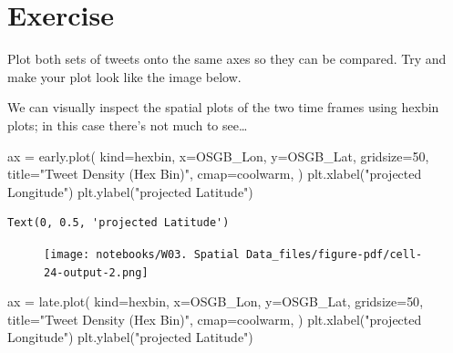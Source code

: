 \documentclass[
  letterpaper,
  DIV=11,
  numbers=noendperiod]{scrreprt}
\newenvironment{Shaded}{\begin{snugshade}}{\end{snugshade}}
\newcommand{\DecValTok}[1]{\textcolor[rgb]{0.68,0.00,0.00}{#1}}
\newcommand{\NormalTok}[1]{\textcolor[rgb]{0.00,0.23,0.31}{#1}}
\newcommand{\OperatorTok}[1]{\textcolor[rgb]{0.37,0.37,0.37}{#1}}
\newcommand{\StringTok}[1]{\textcolor[rgb]{0.13,0.47,0.30}{#1}}
\begin{document}
\hypertarget{exercise-8}{%
\section{Exercise}\label{exercise-8}}

Plot both sets of tweets onto the same axes so they can be compared. Try
and make your plot look like the image below.

We can visually inspect the spatial plots of the two time frames using
hexbin plots; in this case there's not much to see\ldots{}

\begin{Shaded}
\begin{Highlighting}[]
\NormalTok{ax }\OperatorTok{=}\NormalTok{ early.plot(}
\NormalTok{    kind}\OperatorTok{=}\StringTok{\textquotesingle{}hexbin\textquotesingle{}}\NormalTok{,}
\NormalTok{    x}\OperatorTok{=}\StringTok{\textquotesingle{}OSGB\_Lon\textquotesingle{}}\NormalTok{, }
\NormalTok{    y}\OperatorTok{=}\StringTok{\textquotesingle{}OSGB\_Lat\textquotesingle{}}\NormalTok{,}
\NormalTok{    gridsize}\OperatorTok{=}\DecValTok{50}\NormalTok{,}
\NormalTok{    title}\OperatorTok{=}\StringTok{"Tweet Density (Hex Bin)"}\NormalTok{,}
\NormalTok{    cmap}\OperatorTok{=}\StringTok{\textquotesingle{}coolwarm\textquotesingle{}}\NormalTok{,}
\NormalTok{    )}
\NormalTok{plt.xlabel(}\StringTok{"projected Longitude"}\NormalTok{)}
\NormalTok{plt.ylabel(}\StringTok{"projected Latitude"}\NormalTok{)}
\end{Highlighting}
\end{Shaded}

\begin{verbatim}
Text(0, 0.5, 'projected Latitude')
\end{verbatim}

\begin{figure}[H]

{\centering \texttt{[image: notebooks/W03. Spatial Data\_files/figure-pdf/cell-24-output-2.png]}

}

\end{figure}

\begin{Shaded}
\begin{Highlighting}[]
\NormalTok{ax }\OperatorTok{=}\NormalTok{ late.plot(}
\NormalTok{    kind}\OperatorTok{=}\StringTok{\textquotesingle{}hexbin\textquotesingle{}}\NormalTok{,}
\NormalTok{    x}\OperatorTok{=}\StringTok{\textquotesingle{}OSGB\_Lon\textquotesingle{}}\NormalTok{, }
\NormalTok{    y}\OperatorTok{=}\StringTok{\textquotesingle{}OSGB\_Lat\textquotesingle{}}\NormalTok{,}
\NormalTok{    gridsize}\OperatorTok{=}\DecValTok{50}\NormalTok{,}
\NormalTok{    title}\OperatorTok{=}\StringTok{"Tweet Density (Hex Bin)"}\NormalTok{,}
\NormalTok{    cmap}\OperatorTok{=}\StringTok{\textquotesingle{}coolwarm\textquotesingle{}}\NormalTok{,}
\NormalTok{    )}
\NormalTok{plt.xlabel(}\StringTok{"projected Longitude"}\NormalTok{)}
\NormalTok{plt.ylabel(}\StringTok{"projected Latitude"}\NormalTok{)}
\end{Highlighting}
\end{Shaded}
\end{document}

